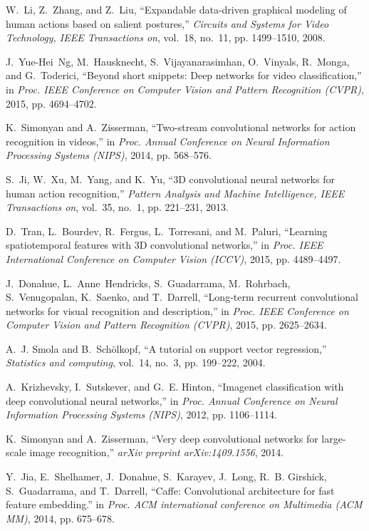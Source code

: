 \documentclass[10pt, a4paper, conference]{IEEEtran}
\begin{document}
\begin{thebibliography}{10}
W.~Li, Z.~Zhang, and Z.~Liu, ``Expandable data-driven graphical modeling of
  human actions based on salient postures,'' \emph{Circuits and Systems for
  Video Technology, IEEE Transactions on}, vol.~18, no.~11, pp. 1499--1510,
  2008.

J.~Yue-Hei~Ng, M.~Hausknecht, S.~Vijayanarasimhan, O.~Vinyals, R.~Monga, and
  G.~Toderici, ``Beyond short snippets: Deep networks for video
  classification,'' in \emph{Proc. IEEE Conference on Computer Vision and
  Pattern Recognition (CVPR)}, 2015, pp. 4694--4702.

K.~Simonyan and A.~Zisserman, ``Two-stream convolutional networks for action
  recognition in videos,'' in \emph{Proc. Annual Conference on Neural
  Information Processing Systems (NIPS)}, 2014, pp. 568--576.

S.~Ji, W.~Xu, M.~Yang, and K.~Yu, ``{3D} convolutional neural networks for
  human action recognition,'' \emph{Pattern Analysis and Machine Intelligence,
  IEEE Transactions on}, vol.~35, no.~1, pp. 221--231, 2013.

D.~Tran, L.~Bourdev, R.~Fergus, L.~Torresani, and M.~Paluri, ``Learning
  spatiotemporal features with {3D} convolutional networks,'' in \emph{Proc.
  IEEE International Conference on Computer Vision (ICCV)}, 2015, pp.
  4489--4497.

J.~Donahue, L.~Anne~Hendricks, S.~Guadarrama, M.~Rohrbach, S.~Venugopalan,
  K.~Saenko, and T.~Darrell, ``Long-term recurrent convolutional networks for
  visual recognition and description,'' in \emph{Proc. IEEE Conference on
  Computer Vision and Pattern Recognition (CVPR)}, 2015, pp. 2625--2634.

A.~J. Smola and B.~Sch{\"o}lkopf, ``A tutorial on support vector regression,''
  \emph{Statistics and computing}, vol.~14, no.~3, pp. 199--222, 2004.

A.~Krizhevsky, I.~Sutskever, and G.~E. Hinton, ``Imagenet classification with
  deep convolutional neural networks,'' in \emph{Proc. Annual Conference on
  Neural Information Processing Systems (NIPS)}, 2012, pp. 1106--1114.

K.~Simonyan and A.~Zisserman, ``Very deep convolutional networks for
  large-scale image recognition,'' \emph{arXiv preprint arXiv:1409.1556}, 2014.

Y.~Jia, E.~Shelhamer, J.~Donahue, S.~Karayev, J.~Long, R.~B. Girshick,
  S.~Guadarrama, and T.~Darrell, ``Caffe: Convolutional architecture for fast
  feature embedding.'' in \emph{Proc. ACM international conference on
  Multimedia (ACM MM)}, 2014, pp. 675--678.


\end{thebibliography}
\end{document}
